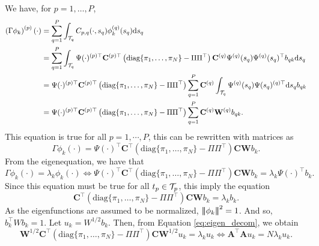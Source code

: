 We have, for $p = 1, \dots, P$,
\begin{align*}
    \left(\Gamma \phi_k\right)^{(p)}(\cdot) &= \sum_{q = 1}^P \int_{\mathcal{T}_{q}} C_{p, q}(\cdot, s_q)\phi_k^{(q)}(s_q) {\rm d} s_q \\
    &= \sum_{q = 1}^P \int_{\mathcal{T}_{q}} \Psi(\cdot)^{(p) \top} \mathbf{C}^{(p) \top} \left(\text{diag}\{\pi_1, \dots, \pi_N\} - \Pi\Pi^\top\right)\mathbf{C}^{(q)} \Psi^{(q)}(s_q) \Psi^{(q)}(s_q)^\top b_{q k} {\rm d} s_q \\
    &= \Psi(\cdot)^{(p) \top} \mathbf{C}^{(p) \top} \left(\text{diag}\{\pi_1, \dots, \pi_N\} - \Pi\Pi^\top\right)\sum_{q = 1}^P \mathbf{C}^{(q)} \int_{\mathcal{T}_{q}} \Psi^{(q)}(s_q) \Psi(s_q)^{(q) \top} {\rm d} s_q b_{q k} \\
    &= \Psi(\cdot)^{(p) \top} \mathbf{C}^{(p) \top} \left(\text{diag}\{\pi_1, \dots, \pi_N\} - \Pi\Pi^\top\right) \sum_{q = 1}^P \mathbf{C}^{(q)} \mathbf{W}^{(q)} b_{q k}. \\
\end{align*}
This equation is true for all $p = 1, \cdots, P$, this can be rewritten with matrices as
\begin{equation}
    \Gamma \phi_k(\cdot) = \Psi(\cdot)^{\top} \mathbf{C}^{\top} \left(\text{diag}\{\pi_1, \dots, \pi_N\} - \Pi\Pi^\top\right) \mathbf{C} \mathbf{W} b_{k}.
\end{equation}
From the eigenequation, we have that
\begin{equation}
    \Gamma \phi_k(\cdot) = \lambda_k \phi_k(\cdot) \Longleftrightarrow \Psi(\cdot)^{\top} \mathbf{C}^{\top} \left(\text{diag}\{\pi_1, \dots, \pi_N\} - \Pi\Pi^\top\right) \mathbf{C} \mathbf{W} b_{k} = \lambda_k \Psi(\cdot)^\top b_k.
\end{equation}
Since this equation must be true for all $t_p \in \mathcal{T}_{p}$, this imply the equation
\begin{equation}\label{eq:eigen_decom}
    \mathbf{C}^{\top} \left(\text{diag}\{\pi_1, \dots, \pi_N\} - \Pi\Pi^\top\right) \mathbf{C} \mathbf{W} b_{k} = \lambda_k b_k.
\end{equation}
As the eigenfunctions are assumed to be normalized, $\left|\!\left|\!\left|\phi_k\right|\!\right|\!\right|^2 = 1$. And so, $b_k^\top W b_k = 1$. Let $u_k = W^{1/2}b_k$. Then, from Equation \eqref{eq:eigen_decom}, we obtain
\begin{equation}\label{eq:eigen_cov_op}
    \mathbf{W}^{1/2} \mathbf{C}^{\top} \left(\text{diag}\{\pi_1, \dots, \pi_N\} - \Pi\Pi^\top\right) \mathbf{C} \mathbf{W}^{1/2} u_k = \lambda_k u_k \Longleftrightarrow \mathbf{A}^\top\mathbf{A} u_k = N\lambda_k u_k.
\end{equation}
